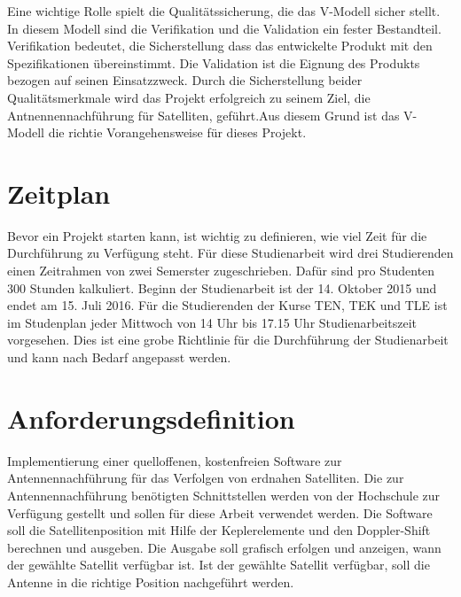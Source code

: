 Eine wichtige Rolle spielt die Qualitätssicherung, die das V-Modell sicher stellt. In diesem Modell sind die Verifikation und die Validation ein 
fester Bestandteil. Verifikation bedeutet, die Sicherstellung dass das entwickelte Produkt mit den Spezifikationen übereinstimmt.
Die Validation ist die Eignung des Produkts bezogen auf seinen Einsatzzweck. Durch die Sicherstellung beider Qualitätsmerkmale wird das Projekt 
erfolgreich zu seinem Ziel, die Antnennennachführung für Satelliten, geführt.Aus diesem Grund ist das V-Modell die richtie Vorangehensweise für 
dieses Projekt.
\newpar

\section{Zeitplan}
Bevor ein Projekt starten kann, ist wichtig  zu definieren, wie viel Zeit für die Durchführung zu Verfügung steht. Für diese Studienarbeit 
wird drei Studierenden einen Zeitrahmen von zwei Semerster zugeschrieben. Dafür sind pro Studenten 300 Stunden kalkuliert. Beginn der Studienarbeit 
ist der 14. Oktober 2015 und endet am 15. Juli 2016. Für die Studierenden der Kurse TEN, TEK und TLE ist im Studenplan jeder Mittwoch von 14 Uhr bis 
17.15 Uhr Studienarbeitszeit vorgesehen. Dies ist eine grobe Richtlinie für die Durchführung der Studienarbeit und kann nach Bedarf angepasst werden.
\newpar

\section{Anforderungsdefinition}
Implementierung einer quelloffenen, kostenfreien Software zur Antennennachführung für das Verfolgen von erdnahen Satelliten. Die zur Antennennachführung
benötigten Schnittstellen werden von der Hochschule zur Verfügung gestellt und sollen für diese Arbeit verwendet werden. Die Software soll die 
Satellitenposition mit Hilfe der Keplerelemente und den Doppler-Shift berechnen und ausgeben. Die Ausgabe soll grafisch erfolgen und anzeigen, wann
der gewählte Satellit verfügbar ist. Ist der gewählte Satellit verfügbar, soll die Antenne in die richtige Position nachgeführt werden. 
\newpar

